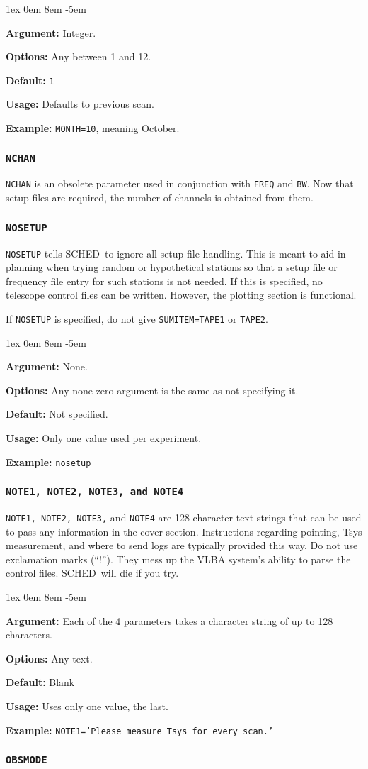 \documentclass{report}
\newcommand{\schedb}{{\sc SCHED~}}
\newcommand{\rcwbox}[5]{
  \begin{list}{}{\parsep 1ex  \itemsep 0em
                 \leftmargin 8em  \itemindent -5em }
    \item {\bf Argument:} #1
    \item {\bf Options:}  #2
    \item {\bf Default:}  #3
    \item {\bf Usage:}    #4
    \item {\bf Example:}  #5
  \end{list}
}
\begin{document}
\rcwbox
{Integer.}
{Any between 1 and 12.}
{{\tt 1}}
{Defaults to previous scan.}
{{\tt MONTH=10}, meaning October.}


\subsubsection{\label{MP:NCHAN}{\tt NCHAN}}

{\tt NCHAN} is an obsolete parameter used in conjunction with {\tt FREQ} and
{\tt BW}.  Now that setup files are required, the number of channels is
obtained from them.

\subsubsection{\label{MP:NOSETUP}{\tt NOSETUP}}

{\tt NOSETUP} tells \schedb to ignore all setup file handling.  This
is meant to aid in planning when trying random or hypothetical
stations so that a setup file or frequency file entry for such
stations is not needed.  If this is specified, no telescope control
files can be written.  However, the plotting section is functional.

If {\tt NOSETUP} is specified, do not give {\tt SUMITEM=TAPE1} or
{\tt TAPE2}.

\rcwbox
{None.}
{Any none zero argument is the same as not specifying it.}
{Not specified.}
{Only one value used per experiment.}
{{\tt nosetup}}

\subsubsection{\label{MP:NOTE1}{\tt NOTE1, NOTE2, NOTE3, and NOTE4}}

{\tt NOTE1, NOTE2, NOTE3,} and {\tt NOTE4} are 128-character text strings that
can be used to pass any information in the cover section. Instructions
regarding pointing, Tsys measurement, and where to send logs are typically
provided this way.  Do not use exclamation marks (``!'').  They mess up
the VLBA system's ability to parse the control files.  \schedb will die
if you try.

\rcwbox
{Each of the 4 parameters takes a character string of up to 128
characters.}
{Any text.}
{Blank}
{Uses only one value, the last.}
{{\tt NOTE1='Please measure Tsys for every scan.'}}


\subsubsection{\label{MP:OBSMODE}{\tt OBSMODE}}
\end{document}

